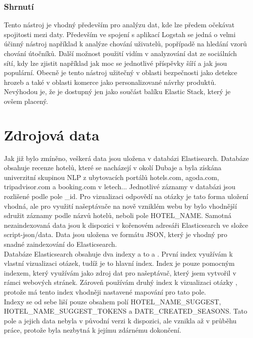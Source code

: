 \documentclass[czech,BP]{thesiskiv}
\begin{document}
\subsection{Shrnutí}
Tento nástroj je vhodný především pro analýzu dat, kde lze předem očekávat spojitosti mezi daty. Především ve spojení s aplikací Logstah se jedná o velmi účinný nástroj například k analýze chování uživatelů, popřípadě na hledání vzorů chování útočníků. Další možnost použití vidím v analyzování dat ze sociálních sítí, kdy lze zjistit například jak moc se jednotlivé příspěvky šíří a jak jsou populární. Obecně je tento nástroj užitečný v oblasti bezpečnosti jako detekce hrozeb a také v oblasti komerce jako personalizované návrhy produktů. Nevýhodou je, že je dostupný jen jako součást balíku Elastic Stack, který je ovšem placený.

\chapter{Zdrojová data}
Jak již bylo zmíněno, veškerá data jsou uložena v databázi Elastisearch. Databáze obsahuje recenze hotelů, které se nacházejí v okolí Dubaje a byla získána univerzitní skupinou NLP z ubytovacích portálů hotels.com, agoda.com, tripadvisor.com a booking.com v letech... Jednotlivé záznamy v databázi jsou rozlišené podle pole \_id. Pro vizualizaci odpovědí na otázky je tato forma uložení vhodná, ale pro využití našeptávače na nově vzniklém  webu by bylo vhodnější sdružit záznamy podle názvů hotelů, neboli pole HOTEL\_NAME. Samotná nezaindexovaná data jsou k dispozici v kořenovém adresáři Elasticsearch ve složce script-json/data. Data jsou uložena ve formátu JSON, který je vhodný pro snadné zaindexování do Elasticsearch.
\\
Databáze Elasticsearch obsahuje dva indexy a to  a . První index využívám k vlastní vizualizaci otázek, tudíž je to hlavní index. Index  je pouze pomocným indexem, který využívám jako zdroj dat pro našeptávač, který jsem vytvořil v rámci webových stránek. Zároveň používám druhý index k vizualizaci otázky , protože má tento index vhodněji nastavené mapování pro tato pole.
\\
Indexy se od sebe liší pouze obsahem polí HOTEL\_NAME\_SUGGEST, HOTEL\_NAME\_SUGGEST\_TOKENS a DATE\_CREATED\_SEASONS. Ta\-to pole a jejich data nebyla v původní verzi k dispozici, ale vznikla až v průběhu práce, protože byla nezbytná k jejímu zdárnému dokončení. 
\end{document}
